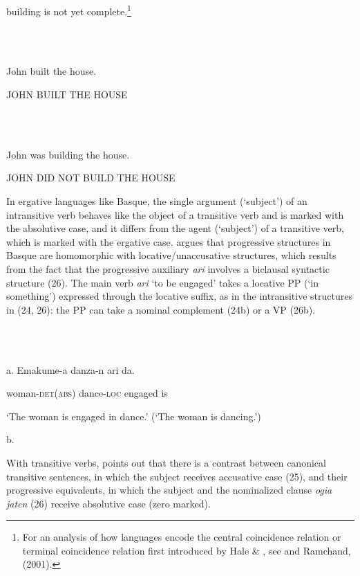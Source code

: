 \documentclass[output=paper]{langsci/langscibook}
\begin{document}
building is not yet complete.\footnote{For an analysis of how languages encode the central coincidence relation or terminal coincidence relation first introduced by Hale \& \citet{Keyser1993}, see \citet{Mateu2004} and Ramchand,(2001).}

\ea%
    \label{ex:key:22}
    \gll\\
        \\
    \glt
    \z

          John built the house.

JOHN BUILT THE HOUSE

\ea%
    \label{ex:key:23}
    \gll\\
        \\
    \glt
    \z

          John was building the house.

JOHN DID NOT BUILD THE HOUSE

In ergative languages like Basque, the single argument (‘subject’) of an intransitive verb behaves like the object of a transitive verb and is marked with the absolutive case, and it differs from the agent (‘subject’) of a transitive verb, which is marked with the ergative case. \citet{Laka2006} argues that progressive structures in Basque are homomorphic with locative/unaccusative structures, which results from the fact that the progressive auxiliary \textit{ari} involves a biclausal syntactic structure (26). The main verb \textit{ari} ‘to be engaged’ takes a locative PP (‘in something’) expressed through the locative suffix, as in the intransitive structures in (24, 26): the PP can take a nominal complement (24b) or a VP (26b). 

\ea%
    \label{ex:key:24}
    \gll\\
        \\
    \glt
    \z

          a.  Emakume-a     danza-n   ari    da.

     woman-\textsc{det(abs)} dance-\textsc{loc} engaged  is

     ‘The woman is engaged in dance.’ (‘The woman is dancing.’) \citep{Laka2006}

b.

 

With transitive verbs, \citet{Laka2006} points out that there is a contrast between canonical transitive sentences, in which the subject receives accusative case (25), and their progressive equivalents, in which the subject and the nominalized clause \textit{ogia jaten} (26) receive absolutive case (zero marked).
\end{document}
